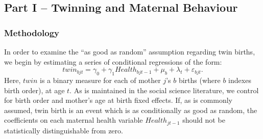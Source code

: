 \documentclass[subeqn]{article}
\begin{document}
\begin{spacing}{1.4}



\part*{Part I -- Twinning and Maternal Behaviour}
\section{Methodology}
\label{TWINscn:method}
In order to examine the ``as good as random'' assumption regarding twin births,
we begin by estimating a series of conditional regressions of the form:
\begin{equation}
  \label{TWINeqn:twinreg}
  twin_{bjt}=\gamma_0 + \gamma_1 Health_{bjt-1} + \mu_b + \lambda_t
            + \varepsilon_{bjt}.
\end{equation}
Here, $twin$ is a binary measure for each of mother $j$'s $b$ births (where $b$
indexes birth order), at age $t$.  As is maintained in the social science
literature, we control for birth order and mother's age at birth fixed effects.
If, as is commonly assumed, twin birth is an event which is as conditionally as
good as random, the coefficients on each maternal health variable
$Health_{jt-1}$ should not be statistically distinguishable from zero.


\end{spacing}
\end{document}

